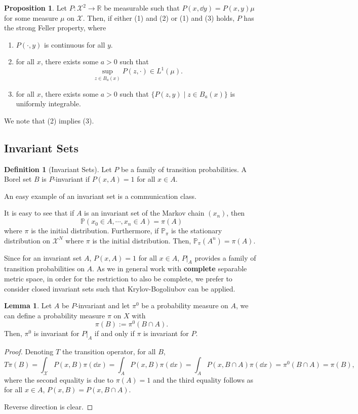 \documentclass[]{article}
\theoremstyle{definition}
\theoremstyle{definition}
\newtheorem{definition}{Definition}[section]
\newtheorem{lemma}{Lemma}[section]
\newtheorem{proposition}{Proposition}[section]
\begin{document}
\begin{proposition}
  Let \(P : \mathcal{X}^2 \to \mathbb{R}\) be measurable such that 
  \(P(x, \dd y) = P(x, y)\mu\) for some measure \(\mu\) on \(\mathcal{X}\). 
  Then, if either (1) and (2) or (1) and (3) holds, \(P\) has the strong 
  Feller property, where 
  \begin{enumerate}
    \item \(P(\cdot, y)\) is continuous for all \(y\).
    \item for all \(x\), there exists some \(a > 0\) such that 
      \[\sup_{z \in B_a(x)} P(z, \cdot) \in L^1(\mu).\]
    \item for all \(x\), there exists some \(a > 0\) such that 
      \(\{P(z, y) \mid z \in B_a(x)\}\) is uniformly integrable.
  \end{enumerate}
  We note that (2) implies (3).
\end{proposition}

\subsection{Invariant Sets}

\begin{definition}[Invariant Sets]
  Let \(P\) be a family of transition probabilities. A Borel set \(B\) 
  is \(P\)-invariant if \(P(x, A) = 1\) for all \(x \in A\).
\end{definition}

An easy example of an invariant set is a communication class. 

It is easy to see that if \(A\) is an invariant set of the Markov chain 
\((x_n)\), then 
\[\mathbb{P}(x_0 \in A, \cdots, x_n \in A) = \pi(A)\]
where \(\pi\) is the initial distribution. Furthermore, if \(\mathbb{P}_\pi\) 
is the stationary distribution on \(\mathcal{X}^N\) where \(\pi\) is the 
initial distribution. Then, \(\mathbb{P}_\pi(A^n) = \pi(A)\).

Since for an invariant set \(A\), \(P(x, A) = 1\) for all \(x \in A\), 
\(P|_A\) provides a family of transition probabilities on \(A\). 
As we in general work with \textbf{complete} separable metric space, 
in order for the restriction to also be complete, we prefer to consider 
closed invariant sets such that Krylov-Bogoliubov can be applied.

\begin{lemma}
  Let \(A\) be \(P\)-invariant and let \(\pi^0\) be a probability measure 
  on \(A\), we can define a probability measure \(\pi\) on \(X\) with 
  \[\pi(B) := \pi^0(B \cap A).\]
  Then, \(\pi^0\) is invariant for \(P|_A\) if and only if \(\pi\) is invariant 
  for \(P\).
\end{lemma}
\begin{proof}
  Denoting \(T\) the transition operator, for all \(B\), 
  \[T\pi(B) = \int_{\mathcal{X}} P(x, B) \pi(\dd x) = 
    \int_A P(x, B) \pi(\dd x) = \int_A P(x, B \cap A) \pi(\dd x) 
    = \pi^0(B \cap A) = \pi(B),\]
  where the second equality is due to \(\pi(A) = 1\) and the third equality 
  follows as for all \(x \in A\), \(P(x, B) = P(x, B \cap A)\).

  Reverse direction is clear.
\end{proof}
\end{document}
